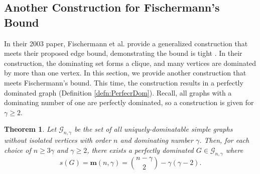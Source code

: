 \documentclass[12pt]{amsart}
\newtheorem{thm}{Theorem}
\begin{document}
\subsection{Another Construction for Fischermann's Bound}\label{sect:FishConstruction}
In their 2003 paper, Fischermann et al. provide a generalized construction that meets their proposed edge bound, demonstrating the bound is tight \cite{Original_Paper}. In their construction, the dominating set forms a clique, and many vertices are dominated by more than one vertex. In this section, we provide another construction that meets Fischermann's bound. This time, the construction results in a perfectly dominated graph (Definition \ref{defn:PerfecrDom}). Recall, all graphs with a dominating number of one are perfectly dominated, so a construction is given for $\gamma \geq 2$.
\begin{thm}\label{thm:PerfectGraphAllG}
     Let $\mathcal{G}_{n,\gamma}$ be the set of all uniquely-dominatable simple graphs without isolated vertices with order $n$ and dominating number $\gamma$. Then, for each choice of $n\geq 3\gamma$ and $\gamma \geq 2$, there exists a perfectly dominated $G \in \mathcal{G}_{n,\gamma}$ where $$s(G) = \mathbf{m}(n,\gamma) = {n - \gamma\choose{2}} - \gamma(\gamma-2).$$
\end{thm}
\end{document}
